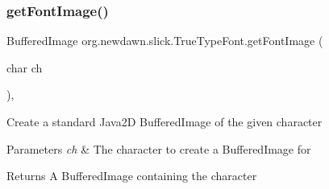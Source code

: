 \subsubsection{\texorpdfstring{get\+Font\+Image()}{getFontImage()}}
{\footnotesize\ttfamily Buffered\+Image org.\+newdawn.\+slick.\+True\+Type\+Font.\+get\+Font\+Image (\begin{DoxyParamCaption}\item[{char}]{ch }\end{DoxyParamCaption})\hspace{0.3cm}{\ttfamily [inline]}, {\ttfamily [private]}}

Create a standard Java2D Buffered\+Image of the given character


\begin{DoxyParams}{Parameters}
{\em ch} & The character to create a Buffered\+Image for\\
\hline
\end{DoxyParams}
\begin{DoxyReturn}{Returns}
A Buffered\+Image containing the character 
\end{DoxyReturn}

